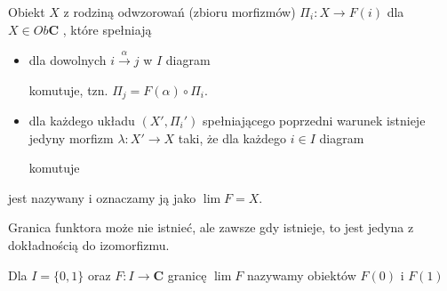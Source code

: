 \begin{definition}
  Obiekt $X$ z rodziną odwzorowań (zbioru morfizmów) $\Pi_i:X\to F(i)$ dla $X\in Ob\mathbf{C}$ , które spełniają
  \begin{itemize}
    \item \acc{[zgodność]} dla dowolnych $i\xrightarrow{\alpha}j$ w $I$ diagram
      \begin{center}\end{center}
      komutuje, tzn. $\Pi_j=F(\alpha)\circ\Pi_i$.
    \item \acc{[uniwersalność]} dla każdego układu $(X',\Pi_i')$ spełniającego poprzedni warunek istnieje jedyny morfizm $\lambda:X'\to X$ taki, że dla każdego $i\in I$ diagram
      \begin{center}\end{center}
    komutuje
  \end{itemize}
  jest nazywany  i oznaczamy ją jako $\lim F=X$.
\end{definition}

Granica funktora może nie istnieć, ale zawsze gdy istnieje, to jest jedyna z dokładnością do izomorfizmu.

\begin{example}
  \item Dla $I=\{0,1\}$ oraz $F:I\to \mathbf{C}$ granicę $\lim F$ nazywamy  obiektów $F(0)$ i $F(1)$
    \begin{center}\end{center}
\end{example}

